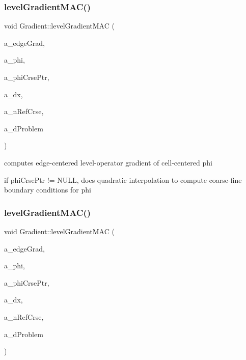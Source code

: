 \subsubsection{\texorpdfstring{level\+Gradient\+M\+A\+C()}{levelGradientMAC()}\hspace{0.1cm}{\footnotesize\ttfamily [1/4]}}
{\footnotesize\ttfamily void Gradient\+::level\+Gradient\+M\+AC (\begin{DoxyParamCaption}\item[{\textbf{ Level\+Data}$<$ \textbf{ Flux\+Box} $>$ \&}]{a\+\_\+edge\+Grad,  }\item[{\textbf{ Level\+Data}$<$ \textbf{ F\+Array\+Box} $>$ \&}]{a\+\_\+phi,  }\item[{const \textbf{ Level\+Data}$<$ \textbf{ F\+Array\+Box} $>$ $\ast$}]{a\+\_\+phi\+Crse\+Ptr,  }\item[{const \textbf{ Real}}]{a\+\_\+dx,  }\item[{const int}]{a\+\_\+n\+Ref\+Crse,  }\item[{const \textbf{ Problem\+Domain} \&}]{a\+\_\+d\+Problem }\end{DoxyParamCaption})\hspace{0.3cm}{\ttfamily [static]}}



computes edge-\/centered level-\/operator gradient of cell-\/centered phi 

if phi\+Crse\+Ptr != N\+U\+LL, does quadratic interpolation to compute coarse-\/fine boundary conditions for phi \mbox{\label{class_gradient_a984db420418480a063fa7e60dc18144d}} 
\subsubsection{\texorpdfstring{level\+Gradient\+M\+A\+C()}{levelGradientMAC()}\hspace{0.1cm}{\footnotesize\ttfamily [2/4]}}
{\footnotesize\ttfamily void Gradient\+::level\+Gradient\+M\+AC (\begin{DoxyParamCaption}\item[{\textbf{ Level\+Data}$<$ \textbf{ Flux\+Box} $>$ \&}]{a\+\_\+edge\+Grad,  }\item[{\textbf{ Level\+Data}$<$ \textbf{ F\+Array\+Box} $>$ \&}]{a\+\_\+phi,  }\item[{const \textbf{ Level\+Data}$<$ \textbf{ F\+Array\+Box} $>$ $\ast$}]{a\+\_\+phi\+Crse\+Ptr,  }\item[{const \textbf{ Real}}]{a\+\_\+dx,  }\item[{const int}]{a\+\_\+n\+Ref\+Crse,  }\item[{const \textbf{ Box} \&}]{a\+\_\+d\+Problem }\end{DoxyParamCaption})\hspace{0.3cm}{\ttfamily [static]}}



